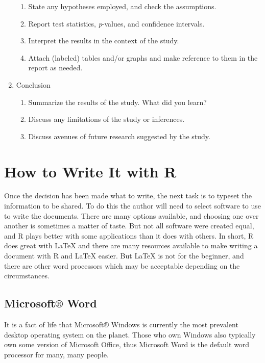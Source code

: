 \documentclass[captions=tableheading]{scrbook}
\begin{document}
\begin{enumerate}
\begin{enumerate}
\item State any hypotheses employed, and check the assumptions.
\item Report test statistics, \emph{p}-values, and confidence intervals.
\item Interpret the results in the context of the study.
\item Attach (labeled) tables and/or graphs and make reference to them in the report as needed.
\end{enumerate}
\item Conclusion
\begin{enumerate}
\item Summarize the results of the study. What did you learn?
\item Discuss any limitations of the study or inferences.
\item Discuss avenues of future research suggested by the study.
\end{enumerate}
\end{enumerate}
\section{How to Write It with R}
\label{sec-22-2}

\label{sec:How-to-Write}
Once the decision has been made what to write, the next task is to typeset the information to be shared. To do this the author will need to select software to use to write the documents. There are many options available, and choosing one over another is sometimes a matter of taste. But not all software were created equal, and \textsf{R} plays better with some applications than it does with others. 
In short, \textsf{R} does great with \LaTeX{} and there are many resources available to make writing a document with \textsf{R} and \LaTeX{} easier. But \LaTeX{} is not for the beginner, and there are other word processors which may be acceptable depending on the circumstances.
\subsection{Microsoft\(\circledR\) Word}
\label{sec-22-2-1}

It is a fact of life that Microsoft\(\circledR\) Windows is currently the most prevalent desktop operating system on the planet. Those who own Windows also typically own some version of Microsoft Office, thus Microsoft Word is the default word processor for many, many people.  
\end{document}
